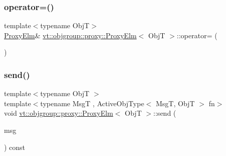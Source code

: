 \subsubsection{\texorpdfstring{operator=()}{operator=()}}
{\footnotesize\ttfamily template$<$typename ObjT$>$ \\
\hyperlink{structvt_1_1objgroup_1_1proxy_1_1_proxy_elm}{Proxy\+Elm}\& \hyperlink{structvt_1_1objgroup_1_1proxy_1_1_proxy_elm}{vt\+::objgroup\+::proxy\+::\+Proxy\+Elm}$<$ ObjT $>$\+::operator= (\begin{DoxyParamCaption}\item[{\hyperlink{structvt_1_1objgroup_1_1proxy_1_1_proxy_elm}{Proxy\+Elm}$<$ ObjT $>$ const \&}]{ }\end{DoxyParamCaption})\hspace{0.3cm}{\ttfamily [default]}}

\mbox{\label{structvt_1_1objgroup_1_1proxy_1_1_proxy_elm_a64d85f6d2721f2001e1e9ecb910e34f9}} 
\subsubsection{\texorpdfstring{send()}{send()}\hspace{0.1cm}{\footnotesize\ttfamily [1/3]}}
{\footnotesize\ttfamily template$<$typename ObjT $>$ \\
template$<$typename MsgT , Active\+Obj\+Type$<$ Msg\+T, Obj\+T $>$ fn$>$ \\
void \hyperlink{structvt_1_1objgroup_1_1proxy_1_1_proxy_elm}{vt\+::objgroup\+::proxy\+::\+Proxy\+Elm}$<$ ObjT $>$\+::send (\begin{DoxyParamCaption}\item[{MsgT $\ast$}]{msg }\end{DoxyParamCaption}) const}

\mbox{\label{structvt_1_1objgroup_1_1proxy_1_1_proxy_elm_ab3d1751dac7c003cd13306277c164247}} 
